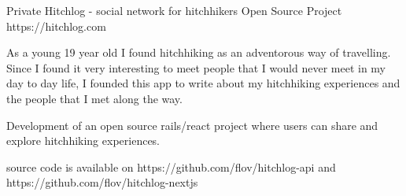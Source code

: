 

\begin{cventries}

  \cventry
    {Private}
    {Hitchlog - social network for hitchhikers} %
    {Open Source Project} %
    {https://hitchlog.com} %
    {
      \begin{cvitems} %
        \item As a young 19 year old I found hitchhiking as an adventorous way of travelling. Since I found it very interesting to meet people that I would never meet in my day to day life, I founded this app to write about my hitchhiking experiences and the people that I met along the way.
        \item Development of an open source rails/react project where users can share and explore hitchhiking experiences.
        \item source code is available on https://github.com/flov/hitchlog-api and https://github.com/flov/hitchlog-nextjs
      \end{cvitems}
    }

\end{cventries}
